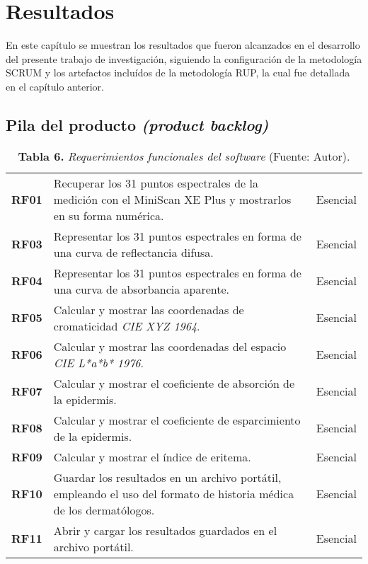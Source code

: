 \chapter{Resultados}

En este cap\'{i}tulo se muestran los resultados que fueron alcanzados en el desarrollo del presente trabajo de investigaci\'{o}n, siguiendo la configuraci\'{o}n de la metodolog\'{i}a SCRUM y los artefactos inclu\'{i}dos de la metodolog\'{i}a RUP, la cual fue detallada en el cap\'{i}tulo anterior.

\section{Pila del producto \textit{(product backlog)}}

	\FloatBarrier
	\begin{table}[htb]
		\small
		\caption{\textbf{Tabla 6.} \textit{Requerimientos funcionales del software} (Fuente: Autor).}
		\centering
		\setlength{\extrarowheight}{\altocelda}
		\begin{tabulary}{\anchotabla}{|c|J|c|}
			\hline
			 &  & \\ \hline
			\textbf{RF01} & Recuperar los 31 puntos espectrales de la medici\'{o}n con el MiniScan XE Plus y mostrarlos en su forma num\'{e}rica. & Esencial\\ \hline

			\textbf{RF03} & Representar los 31 puntos espectrales en forma de una curva de reflectancia difusa. & Esencial\\ \hline
			\textbf{RF04} & Representar los 31 puntos espectrales en forma de una curva de absorbancia aparente. & Esencial\\ \hline
			\textbf{RF05} & Calcular y mostrar las coordenadas de cromaticidad \textit{CIE XYZ 1964}. & Esencial\\ \hline
			\textbf{RF06} & Calcular y mostrar las coordenadas del espacio \textit{CIE L*a*b* 1976}. & Esencial\\ \hline
			\textbf{RF07} & Calcular y mostrar el coeficiente de absorci\'{o}n de la epidermis. & Esencial\\ \hline
			\textbf{RF08} & Calcular y mostrar el coeficiente de esparcimiento de la epidermis. & Esencial\\ \hline
			\textbf{RF09} & Calcular y mostrar el \'{i}ndice de eritema. & Esencial\\ \hline
			\textbf{RF10} & Guardar los resultados en un archivo port\'{a}til, empleando el uso del formato de historia m\'{e}dica de los dermat\'{o}logos. & Esencial\\ \hline
			\textbf{RF11} & Abrir y cargar los resultados guardados en el archivo port\'{a}til. & Esencial\\ \hline
		\end{tabulary}
	\end{table}
\FloatBarrier

